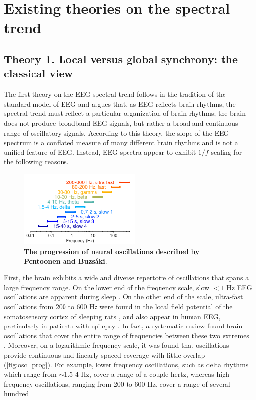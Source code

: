 \section{Existing theories on the spectral trend} \label{sec:theories}

\subsection{Theory 1. Local versus global synchrony: the classical view} \label{sec:all_oscillations}

The first theory on the EEG spectral trend follows in the tradition of the standard model of EEG and argues that, as EEG reflects brain rhythms, the spectral trend must reflect a particular organization of brain rhythms; the brain does not produce broadband EEG signals, but rather a broad and continuous range of oscillatory signals. According to this theory, the slope of the EEG spectrum is a conflated measure of many different brain rhythms and is not a unified feature of EEG. Instead, EEG spectra appear to exhibit $1/f$ scaling for the following reasons.

\begin{figure}
\vspace{-10pt}
\centering
\includegraphics[width=60mm]{Figures/chapter1/rhythm_frequencies.pdf}
\caption{\textbf{The progression of neural oscillations described by Pentoonen and Buzsáki}\cite{Penttonen2003}.}  \label{fig:osc_prog}
\end{figure}

First, the brain exhibits a wide and diverse repertoire of oscillations that spans a large frequency range. On the lower end of the frequency scale, slow $<1$ \unit{\hertz} EEG oscillations are apparent during sleep \cite{Achermann1997}. On the other end of the scale, ultra-fast oscillations from 200 to 600 Hz were found in the local field potential of the somatosensory cortex of sleeping rats \cite{Kandel1997}, and also appear in human EEG, particularly in patients with epilepsy \cite{Frauscher2017}. In fact, a systematic review found brain oscillations that cover the entire range of frequencies between these two extremes \cite{Penttonen2003}. Moreover, on a logarithmic frequency scale, it was found that oscillations provide continuous and linearly spaced coverage with little overlap (\autoref{fig:osc_prog}). For example, lower frequency oscillations, such as delta rhythms which range from $\sim$1.5-4 Hz, cover a range of a couple hertz, whereas high frequency oscillations, ranging from 200 to 600 Hz, cover a range of several hundred \cite{Penttonen2003}. 

